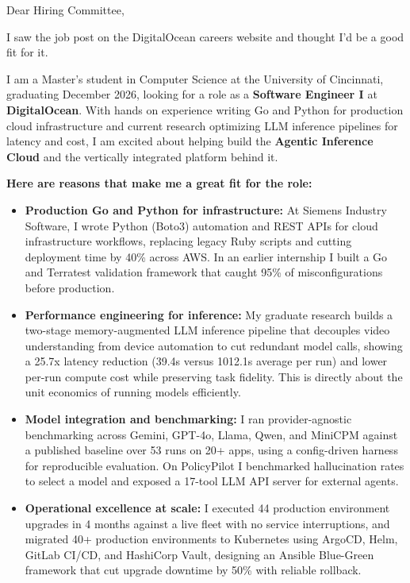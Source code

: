 \documentclass[11pt]{letter}
\date{}
\begin{document}
\begin{letter}{}

\opening{Dear Hiring Committee,}

I saw the job post on the DigitalOcean careers website and thought I'd be a good fit for it.

I am a Master's student in Computer Science at the University of Cincinnati, graduating December 2026, looking for a role as a \textbf{Software Engineer I} at \textbf{DigitalOcean}. With hands on experience writing Go and Python for production cloud infrastructure and current research optimizing LLM inference pipelines for latency and cost, I am excited about helping build the \textbf{Agentic Inference Cloud} and the vertically integrated platform behind it.

\textbf{Here are reasons that make me a great fit for the role:}

\begin{itemize}[leftmargin=*, itemsep=0.45em]
    \item \textbf{Production Go and Python for infrastructure:} At Siemens Industry Software, I wrote Python (Boto3) automation and REST APIs for cloud infrastructure workflows, replacing legacy Ruby scripts and cutting deployment time by 40\% across AWS. In an earlier internship I built a Go and Terratest validation framework that caught 95\% of misconfigurations before production.

    \item \textbf{Performance engineering for inference:} My graduate research builds a two-stage memory-augmented LLM inference pipeline that decouples video understanding from device automation to cut redundant model calls, showing a 25.7x latency reduction (39.4s versus 1012.1s average per run) and lower per-run compute cost while preserving task fidelity. This is directly about the unit economics of running models efficiently.

    \item \textbf{Model integration and benchmarking:} I ran provider-agnostic benchmarking across Gemini, GPT-4o, Llama, Qwen, and MiniCPM against a published baseline over 53 runs on 20+ apps, using a config-driven harness for reproducible evaluation. On PolicyPilot I benchmarked hallucination rates to select a model and exposed a 17-tool LLM API server for external agents.

    \item \textbf{Operational excellence at scale:} I executed 44 production environment upgrades in 4 months against a live fleet with no service interruptions, and migrated 40+ production environments to Kubernetes using ArgoCD, Helm, GitLab CI/CD, and HashiCorp Vault, designing an Ansible Blue-Green framework that cut upgrade downtime by 50\% with reliable rollback.
\end{itemize}


\end{letter}
\end{document}
